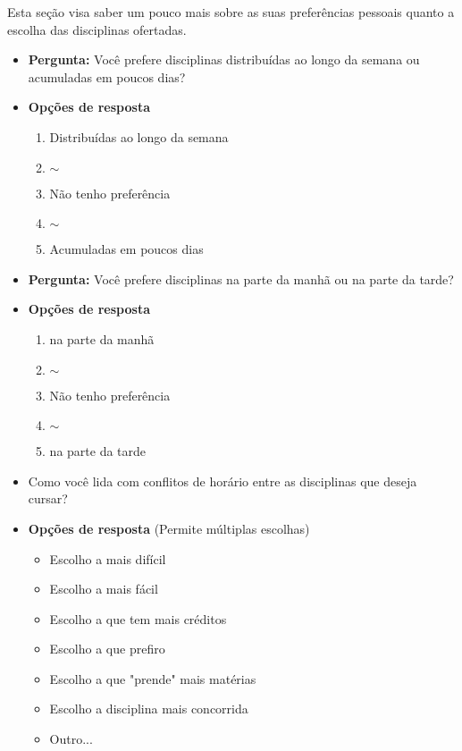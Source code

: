 \begin{apendicesenv}
        Esta seção visa saber um pouco mais sobre as suas preferências pessoais quanto a escolha das disciplinas ofertadas.

        \begin{itemize}
            \item \textbf{Pergunta:} Você prefere disciplinas distribuídas ao longo da semana ou acumuladas em poucos dias?
            \item \textbf{Opções de resposta}
            \begin{enumerate}
                \item Distribuídas ao longo da semana
                \item $\sim$
                \item Não tenho preferência
                \item $\sim$
                \item Acumuladas em poucos dias
            \end{enumerate}
        \end{itemize}

        \begin{itemize}
            \item \textbf{Pergunta:} Você prefere disciplinas na parte da manhã ou na parte da tarde?
            \item \textbf{Opções de resposta}
            \begin{enumerate}
                \item na parte da manhã
                \item $\sim$
                \item Não tenho preferência
                \item $\sim$
                \item na parte da tarde
            \end{enumerate}
        \end{itemize}

        \begin{itemize}
            \item Como você lida com conflitos de horário entre as disciplinas que deseja cursar?
            \item \textbf{Opções de resposta} (Permite múltiplas escolhas)
            \begin{itemize}
                \item Escolho a mais difícil
                \item Escolho a mais fácil
                \item Escolho a que tem mais créditos
                \item Escolho a que prefiro
                \item Escolho a que "prende" mais matérias
                \item Escolho a disciplina mais concorrida
                \item Outro...
            \end{itemize}
        \end{itemize}


\end{apendicesenv}
